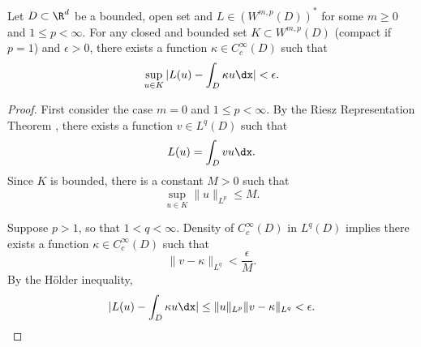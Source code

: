 \begin{lemma}
\label{lemma:wmp_kernelapprox}
Let \(D \subset \R^d\) be a bounded, open set and \(L \in (W^{m,p}(D))^*\) for some \(m \geq 0\)
and \(1 \leq p < \infty\). For any closed and bounded set \(K \subset W^{m,p}(D)\) (compact if \(p=1\)) and \(\epsilon > 0\),
there exists a function \(\kappa \in C^\infty_c (D)\) such that
\[\sup_{u \in K} |L(u) - \int_D \kappa  u \dx| < \epsilon.\]
\end{lemma}
\begin{proof}
First consider the case \(m = 0\) and \(1 \leq p < \infty\). By the Riesz Representation Theorem \cite[Appendix B]{conway2007acourse},
there exists a function \(v \in L^q(D)\) such that
\[L(u) = \int_D v u \dx.\]
Since \(K\) is bounded, there is a constant \(M > 0\) such that
\[\sup_{u \in K} \|u\|_{L^p} \leq M.\]

Suppose \(p > 1\), so that \(1 < q < \infty\). Density of \(C^\infty_c(D)\) in \(L^q (D)\) \cite[Corollary 2.30]{adams2003sobolev}  implies there exists 
a function \(\kappa \in C^\infty_c(D)\) such that
\[\|v - \kappa\|_{L^q} < \frac{\epsilon}{M}.\]
By the H{\"o}lder inequality,
\[|L(u) - \int_D \kappa u \dx| \leq \|u\|_{L^p} \|v - \kappa\|_{L^q} < \epsilon.\]


\end{proof}
